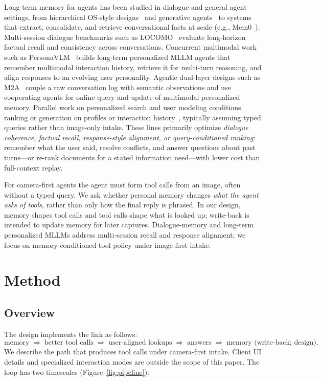\documentclass[11pt,a4paper]{article}
\begin{document}
Long-term memory for agents has been studied in dialogue and general agent settings, from hierarchical OS-style designs~\cite{memgpt} and generative agents~\cite{generative_agents} to systems that extract, consolidate, and retrieve conversational facts at scale (e.g., Mem0~\cite{mem0}). Multi-session dialogue benchmarks such as LOCOMO~\cite{locomo} evaluate long-horizon factual recall and consistency across conversations. Concurrent multimodal work such as PersonaVLM~\cite{personavlm} builds long-term personalized MLLM agents that remember multimodal interaction history, retrieve it for multi-turn reasoning, and align responses to an evolving user personality. Agentic dual-layer designs such as M2A~\cite{m2a} couple a raw conversation log with semantic observations and use cooperating agents for online query and update of multimodal personalized memory. Parallel work on personalized search and user modeling conditions ranking or generation on profiles or interaction history~\cite{personalized_search}, typically assuming typed queries rather than image-only intake. These lines primarily optimize \emph{dialogue coherence, factual recall, response-style alignment, or query-conditioned ranking}: remember what the user said, resolve conflicts, and answer questions about past turns---or re-rank documents for a stated information need---with lower cost than full-context replay.

For camera-first agents the agent must form tool calls from an image, often without a typed query. We ask whether personal memory changes \emph{what the agent asks of tools}, rather than only how the final reply is phrased. In our design, memory shapes tool calls and tool calls shape what is looked up; write-back is intended to update memory for later captures. Dialogue-memory and long-term personalized MLLMs address multi-session recall and response alignment; we focus on memory-conditioned tool policy under image-first intake.

\section{Method}

\subsection{Overview}

The design implements the link as follows:
\[
\text{memory} \;\Rightarrow\; \text{better tool calls} \;\Rightarrow\; \text{user-aligned lookups} \;\Rightarrow\; \text{answers} \;\Rightarrow\; \text{memory (write-back; design)}.
\]
We describe the path that produces tool calls under camera-first intake. Client UI details and specialized interaction modes are outside the scope of this paper. The loop has two timescales (Figure~\ref{fig:pipeline}):
\end{document}
